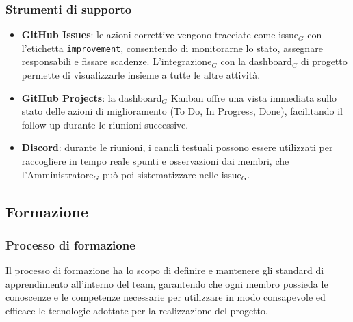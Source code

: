 \documentclass[a4paper, 10pt]{article}
\begin{document}
\subsubsection{Strumenti di supporto}
\label{subsubsec:strumenti_miglioramento}

\begin{itemize}
    \item \textbf{GitHub Issues}: le azioni correttive vengono tracciate come issue$_G$ con l'etichetta \texttt{improvement}, consentendo di monitorarne lo stato, assegnare responsabili e fissare scadenze. L'integrazione$_G$ con la dashboard$_G$ di progetto permette di visualizzarle insieme a tutte le altre attività.
    
    \item \textbf{GitHub Projects}: la dashboard$_G$ Kanban offre una vista immediata sullo stato delle azioni di miglioramento (To Do, In Progress, Done), facilitando il follow-up durante le riunioni successive.
        
    \item \textbf{Discord}: durante le riunioni, i canali testuali possono essere utilizzati per raccogliere in tempo reale spunti e osservazioni dai membri, che l'Amministratore$_G$ può poi sistematizzare nelle issue$_G$.
    
\end{itemize}

\subsection{Formazione}
\label{subsec:formazione}

\subsubsection{Processo di formazione}
\label{subsubsec:processo_formazione}

Il processo di formazione ha lo scopo di definire e mantenere gli standard di apprendimento all'interno del team, garantendo che ogni membro possieda le conoscenze e le competenze necessarie per utilizzare in modo consapevole ed efficace le tecnologie adottate per la realizzazione del progetto.
\end{document}
